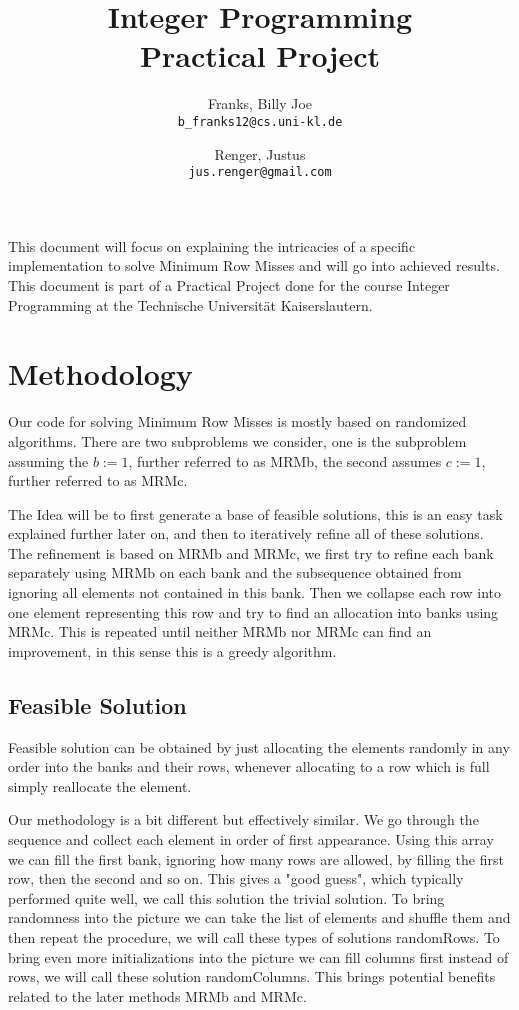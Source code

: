 \documentclass[11pt]{article}
\title{Integer Programming \\ Practical Project}
\author{
	Franks, Billy Joe \\
	\texttt{b\_franks12@cs.uni-kl.de}
	\and 
	Renger, Justus \\
	\texttt{jus.renger@gmail.com}
}
\begin{document}
\maketitle
This document will focus on explaining the intricacies of a specific implementation to solve Minimum Row Misses and will go into achieved results. This document is part of a Practical Project done for the course Integer Programming at the Technische Universität Kaiserslautern.
\section{Methodology}
Our code for solving Minimum Row Misses is mostly based on randomized algorithms. There are two subproblems we consider, one is the subproblem assuming the $b:=1$, further referred to as MRMb, the second assumes $c:=1$, further referred to as MRMc.

The Idea will be to first generate a base of feasible solutions, this is an easy task explained further later on, and then to iteratively refine all of these solutions. The refinement is based on MRMb and MRMc, we first try to refine each bank separately using MRMb on each bank and the subsequence obtained from ignoring all elements not contained in this bank. Then we collapse each row into one element representing this row and try to find an allocation into banks using MRMc. This is repeated until neither MRMb nor MRMc can find an improvement, in this sense this is a greedy algorithm.

\subsection{Feasible Solution}
Feasible solution can be obtained by just allocating the elements randomly in any order into the banks and their rows, whenever allocating to a row which is full simply reallocate the element.

Our methodology is a bit different but effectively similar. We go through the sequence and collect each element in order of first appearance. Using this array we can fill the first bank, ignoring how many rows are allowed, by filling the first row, then the second and so on. This gives a "good guess", which typically performed quite well, we call this solution the trivial solution. To bring randomness into the picture we can take the list of elements and shuffle them and then repeat the procedure, we will call these types of solutions randomRows. To bring even more initializations into the picture we can fill columns first instead of rows, we will call these solution randomColumns. This brings potential benefits related to the later methods MRMb and MRMc.
\end{document}
